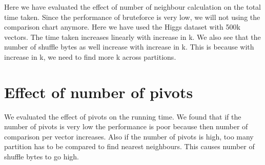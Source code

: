 Here we have evaluated the effect of number of neighbour calculation
on the total time taken. Since the performance of bruteforce is very low, we will not using the
comparison chart anymore. Here we have used the Higgs dataset with
500k vectors. The time taken increases linearly with increase in k. We
also see that the number of shuffle bytes as well increase with
increase in k. This is because with increase in k, we need to find
more k across partitions.

\medskip



\section{Effect of number of pivots}
We evaluated the effect of pivots on the running time.
We found that if the number of pivots is very low the
performance is poor because then number of comparison per vector
increases. Also if the number of pivots is high, too many partition
has to be compared to find nearest neighbours. This causes number of
shuffle bytes to go high.

\medskip


